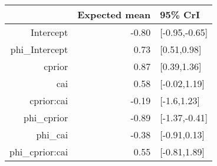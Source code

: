 \begin{tabular}{rrl}
  \hline
 & Expected mean & 95\% CrI \\ 
  \hline
Intercept & -0.80 & [-0.95,-0.65] \\ 
  phi\_Intercept & 0.73 & [0.51,0.98] \\ 
  cprior & 0.87 & [0.39,1.36] \\ 
  cai & 0.58 & [-0.02,1.19] \\ 
  cprior:cai & -0.19 & [-1.6,1.23] \\ 
  phi\_cprior & -0.89 & [-1.37,-0.41] \\ 
  phi\_cai & -0.38 & [-0.91,0.13] \\ 
  phi\_cprior:cai & 0.55 & [-0.81,1.89] \\ 
   \hline
\end{tabular}


